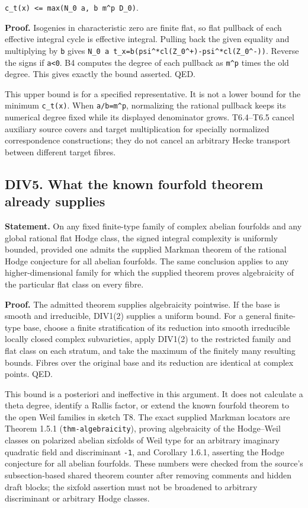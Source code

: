 \documentclass[11pt,a4paper]{article}
\theoremstyle{definition}
\begin{document}
\texttt{c\_t(x)\ \textless{}=\ max(N\_0\ \textbar{}a\textbar{},\ b\ m\^{}p\ D\_0)}.

\textbf{Proof.} Isogenies in characteristic zero are finite flat, so
flat pullback of each effective integral cycle is effective integral.
Pulling back the given equality and multiplying by \texttt{b} gives
\texttt{N\_0\ a\ t\_x=b(psi\^{}*cl(Z\_0\^{}+)-psi\^{}*cl(Z\_0\^{}-))}.
Reverse the signs if \texttt{a\textless{}0}. B4 computes the degree of
each pullback as \texttt{m\^{}p} times the old degree. This gives
exactly the bound asserted. QED.

This upper bound is for a specified representative. It is not a lower
bound for the minimum \texttt{c\_t(x)}. When \texttt{a/b=m\^{}p},
normalizing the rational pullback keeps its numerical degree fixed while
its displayed denominator grows. T6.4--T6.5 cancel auxiliary source
covers and target multiplication for specially normalized correspondence
constructions; they do not cancel an arbitrary Hecke transport between
different target fibres.

\subsection{DIV5. What the known fourfold theorem already
supplies}\label{bounded-division-div5.-what-the-known-fourfold-theorem-already-supplies}

\textbf{Statement.} On any fixed finite-type family of complex abelian
fourfolds and any global rational flat Hodge class, the signed integral
complexity is uniformly bounded, provided one admits the supplied
Markman theorem of the rational Hodge conjecture for all abelian
fourfolds. The same conclusion applies to any higher-dimensional family
for which the supplied theorem proves algebraicity of the particular
flat class on every fibre.

\textbf{Proof.} The admitted theorem supplies algebraicity pointwise. If
the base is smooth and irreducible, DIV1(2) supplies a uniform bound.
For a general finite-type base, choose a finite stratification of its
reduction into smooth irreducible locally closed complex subvarieties,
apply DIV1(2) to the restricted family and flat class on each stratum,
and take the maximum of the finitely many resulting bounds. Fibres over
the original base and its reduction are identical at complex points.
QED.

This bound is a posteriori and ineffective in this argument. It does not
calculate a theta degree, identify a Rallis factor, or extend the known
fourfold theorem to the open Weil families in sketch T8. The exact
supplied Markman locators are Theorem 1.5.1 (\texttt{thm-algebraicity}),
proving algebraicity of the Hodge--Weil classes on polarized abelian
sixfolds of Weil type for an arbitrary imaginary quadratic field and
discriminant \texttt{-1}, and Corollary 1.6.1, asserting the Hodge
conjecture for all abelian fourfolds. These numbers were checked from
the source's subsection-based shared theorem counter after removing
comments and hidden draft blocks; the sixfold assertion must not be
broadened to arbitrary discriminant or arbitrary Hodge classes.
\end{document}
